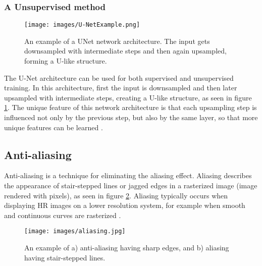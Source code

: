\documentclass[letterpaper, 10 pt, conference]{ieeeconf}  %
\begin{document}
\subsubsection{A Unsupervised method}
\begin{figure}[!ht]
    \caption{An example of a UNet network architecture. 
    The input gets downsampled with intermediate steps and then again upsampled, forming a U-like structure.}
    \centering
    \texttt{[image: images/U-NetExample.png]}
    \label{fig:unet}
\end{figure}
The U-Net architecture can be used for both supervised and unsupervised training. 
In this architecture, first the input is downsampled and then later upsampled with intermediate steps, creating a U-like structure, as seen in figure \ref{fig:unet}.
The unique feature of this network architecture is that each upsampling step is influenced not only by the previous step, but also by the same layer, so that more unique features can be learned \cite{Sharma2022ADL}.

\subsection{Anti-aliasing}

Anti-aliasing is a technique for eliminating the aliasing effect. 
Aliasing describes the appearance of stair-stepped lines or jagged edges in a rasterized image (image rendered with pixels), as seen in figure \ref{fig:antiAliasing}.
Aliasing typically occurs when displaying HR images on a lower resolution system, for example when smooth and continuous curves are rasterized \cite{antialiasing_def}.

\begin{figure}[!ht]
        \caption{An example of a) anti-aliasing having sharp edges, and b) aliasing having stair-stepped lines.}
        \centering
        \texttt{[image: images/aliasing.jpg]}
        \label{fig:antiAliasing}
    \end{figure}
\end{document}
